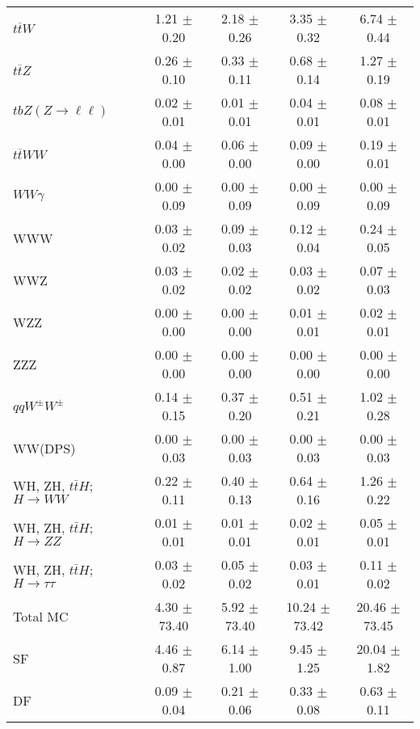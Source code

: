 \begin{tabular}{l|cccc}
                   $t\overline{t}W$ &  1.21 $\pm$  0.20 &  2.18 $\pm$  0.26 &  3.35 $\pm$  0.32 &  6.74 $\pm$  0.44 \\
                   $t\overline{t}Z$ &  0.26 $\pm$  0.10 &  0.33 $\pm$  0.11 &  0.68 $\pm$  0.14 &  1.27 $\pm$  0.19 \\
    $tbZ (Z \rightarrow \ell \ell)$ &  0.02 $\pm$  0.01 &  0.01 $\pm$  0.01 &  0.04 $\pm$  0.01 &  0.08 $\pm$  0.01 \\
                  $t\overline{t}WW$ &  0.04 $\pm$  0.00 &  0.06 $\pm$  0.00 &  0.09 $\pm$  0.00 &  0.19 $\pm$  0.01 \\
                         $WW\gamma$ &  0.00 $\pm$  0.09 &  0.00 $\pm$  0.09 &  0.00 $\pm$  0.09 &  0.00 $\pm$  0.09 \\
                                WWW &  0.03 $\pm$  0.02 &  0.09 $\pm$  0.03 &  0.12 $\pm$  0.04 &  0.24 $\pm$  0.05 \\
                                WWZ &  0.03 $\pm$  0.02 &  0.02 $\pm$  0.02 &  0.03 $\pm$  0.02 &  0.07 $\pm$  0.03 \\
                                WZZ &  0.00 $\pm$  0.00 &  0.00 $\pm$  0.00 &  0.01 $\pm$  0.01 &  0.02 $\pm$  0.01 \\
                                ZZZ &  0.00 $\pm$  0.00 &  0.00 $\pm$  0.00 &  0.00 $\pm$  0.00 &  0.00 $\pm$  0.00 \\
                 $qqW^{\pm}W^{\pm}$ &  0.14 $\pm$  0.15 &  0.37 $\pm$  0.20 &  0.51 $\pm$  0.21 &  1.02 $\pm$  0.28 \\
                            WW(DPS) &  0.00 $\pm$  0.03 &  0.00 $\pm$  0.03 &  0.00 $\pm$  0.03 &  0.00 $\pm$  0.03 \\
WH, ZH, $t\bar{t}H$; $H \rightarrow WW$ &  0.22 $\pm$  0.11 &  0.40 $\pm$  0.13 &  0.64 $\pm$  0.16 &  1.26 $\pm$  0.22 \\
WH, ZH, $t\bar{t}H$; $H \rightarrow ZZ$ &  0.01 $\pm$  0.01 &  0.01 $\pm$  0.01 &  0.02 $\pm$  0.01 &  0.05 $\pm$  0.01 \\
WH, ZH, $t\bar{t}H$; $H \rightarrow \tau\tau$ &  0.03 $\pm$  0.02 &  0.05 $\pm$  0.02 &  0.03 $\pm$  0.01 &  0.11 $\pm$  0.02 \\
\hline\hline
                           Total MC &  4.30 $\pm$ 73.40 &  5.92 $\pm$ 73.40 & 10.24 $\pm$ 73.42 & 20.46 $\pm$ 73.45 \\
\hline
                                 SF &  4.46 $\pm$  0.87 &  6.14 $\pm$  1.00 &  9.45 $\pm$  1.25 & 20.04 $\pm$  1.82 \\
                                 DF &  0.09 $\pm$  0.04 &  0.21 $\pm$  0.06 &  0.33 $\pm$  0.08 &  0.63 $\pm$  0.11 \\

\end{tabular}
